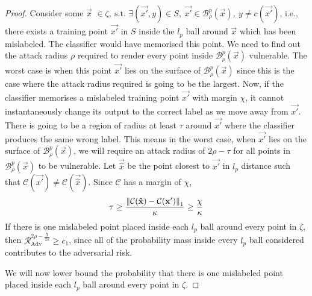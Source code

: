 \documentclass{ociamthesis}
\begin{document}
\begin{proof}
Consider some $\vec{x}$
$
\in \zeta, ~\text{s.t. } \exists (\vec{x'}, y) \in S,~\vec{x'}
\in \mathcal{B}_\rho^p(\vec{x}),~y \neq c(\vec{x'})
$,
i.e., there exists a training point $\vec{x'}$ in $S$ inside the $l_p$ ball
around $\vec{x}$ which has been mislabeled. The classifier would have memorised
this point. We need to find out the attack radius $\rho$ required to render
every point inside $\mathcal{B}_\rho^p(\vec{x})$ vulnerable. The worst case is
when this point $\vec{x'}$ lies on the surface of $\mathcal{B}_\rho^p(\vec{x})$
since this is the case where the attack radius required is going to be the
largest. Now, if the classifier memorises a mislabeled training point $\vec{x'}$
with margin $\chi$, it cannot instantaneously change its output to the correct
label as we move away from $\vec{x'}$. There is going to be a region of radius
at least $\tau$ around $\vec{x'}$ where the classifier produces the same wrong
label. This means in the worst case, when $\vec{x'}$ lies on the surface of
$\mathcal{B}_\rho^p(\vec{x})$, we will require an attack radius of $2\rho-\tau$
for all points in $\mathcal{B}_\rho^p(\vec{x})$ to be vulnerable. Let
$\vec{\hat{x}}$ be the point closest to $\vec{x'}$ in $l_p$ distance such that
$\mathcal{C}(\vec{x'}) \neq \mathcal{C}(\vec{\hat{x}})$. Since $\mathcal{C}$ has
a margin of $\chi$,
\begin{equation*}
    \tau \geq \frac{\mathrm{\left\lVert\mathcal{C}({\mathbf{\hat{x}}}) - \mathcal{C}({\mathbf{x'}})
                \right\rVert}_1}
                    {\kappa}
        \geq
        \frac{\chi}{\kappa}
\end{equation*}
If there is one mislabeled point placed inside each $l_p$ ball around every
point in $\zeta$, then $\mathcal{R}_{\text{Adv}}^{2\rho-\frac{\chi}{2\kappa}}
\geq c_1$, since all of the probability mass inside every $l_p$ ball considered
contributes to the adversarial risk.

We will now lower bound the probability that there is one mislabeled point
placed inside each $l_p$ ball around every point in $\zeta$.


\end{proof}
\end{document}
